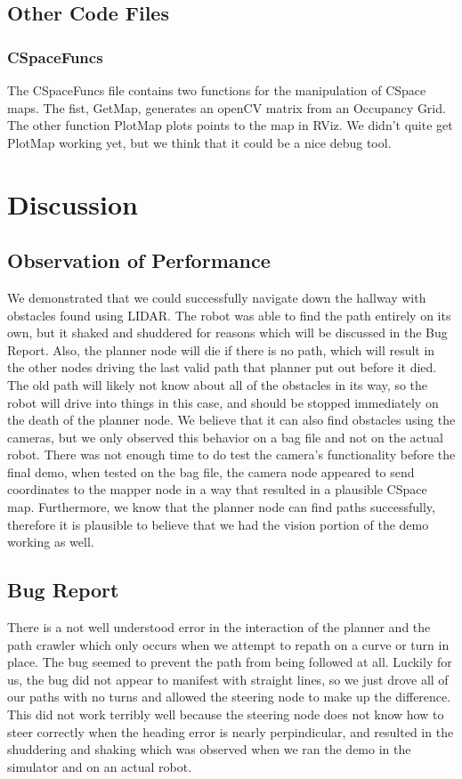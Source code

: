 \documentclass{article}
\begin{document}
\subsection{Other Code Files}
\subsubsection{CSpaceFuncs}
The CSpaceFuncs file contains two functions for the manipulation of CSpace maps.  The fist, GetMap, generates an openCV matrix from an Occupancy Grid.  The other function PlotMap plots points to the map in RViz.  We didn't quite get PlotMap working yet, but we think that it could be a nice debug tool.


\section{Discussion}
\subsection{Observation of Performance}

We demonstrated that we could successfully navigate down the hallway with obstacles found using LIDAR.  
The robot was able to find the path entirely on its own, but it shaked and shuddered for reasons which will be discussed in the Bug Report.
Also, the planner node will die if there is no path, which will result in the other nodes driving the last valid path that planner put out before it died.  
The old path will likely not know about all of the obstacles in its way, so the robot will drive into things in this case, and should be stopped immediately on the death of the planner node.
We believe that it can also find obstacles using the cameras, but we only observed this behavior on a bag file and not on the actual robot.
There was not enough time to do test the camera's functionality before the final demo, when tested on the bag file, the camera node appeared to send coordinates to the mapper node in a way that resulted in a plausible CSpace map.
Furthermore, we know that the planner node can find paths successfully, therefore it is plausible to believe that we had the vision portion of the demo working as well.


\subsection{Bug Report}

There is a not well understood error in the interaction of the planner and the path crawler which only occurs when we attempt to repath on a curve or turn in place. 
The bug seemed to prevent the path from being followed at all.
Luckily for us, the bug did not appear to manifest with straight lines, so we just drove all of our paths with no turns and allowed the steering node to make up the difference.
This did not work terribly well because the steering node does not know how to steer correctly when the heading error is nearly perpindicular, and resulted in the shuddering and shaking which was observed when we ran the demo in the simulator and on an actual robot.
\end{document}
